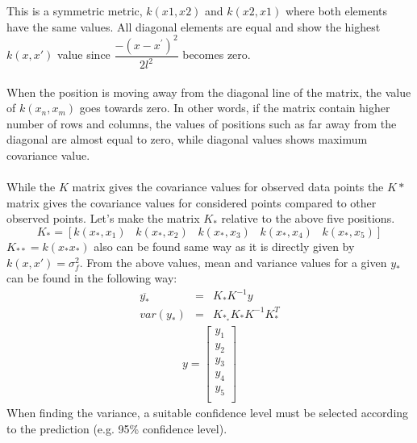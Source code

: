 This is a symmetric metric, $k(x1,x2)$ and $k(x2,x1)$  where both elements have the same values. All diagonal elements are equal and show the highest $k(x,x')$ value since $ \dfrac{-(x-x^{'})^{2}}{2l^{2}} $  becomes zero.
\\\\
When the position is moving away from the diagonal line of the matrix, the value of $k(x_{n},x_{m})$ goes towards zero. In other words, if the matrix contain higher number of rows and columns, the values of positions such as far away from the diagonal are almost equal to zero, while diagonal values shows maximum covariance value.
\\\\
While the $K$ matrix gives the covariance values for observed data points the $K*$ matrix gives the covariance values for considered points compared to other observed points. Let’s make the matrix $K_{*}$ relative to the above five positions.
\begin{equation}
K_{*} = [k(x_{*},x_{1}) \hspace{10pt} k(x_{*},x_{2}) \hspace{10pt} k(x_{*},x_{3}) \hspace{10pt} k(x_{*},x_{4}) \hspace{10pt} k(x_{*},x_{5})]
\label{eq:referanceName}
\end{equation}
$K_{**}= k(x_{*} x_{*})$ also can be found same way as it is directly given by $k(x,x')=\sigma_{f}^{2}$. From the above values, mean and variance values for a given $y_{*}$ can be found in the following way:
\begin{eqnarray}
 \overline{y_{*}} &=& K_{*}K^{-1} y    \nonumber \\
 var(y_{*})&=& K_{*}_{*}K_{*}K^{-1}K_{*}^{T}
\end{eqnarray}
\begin{eqnarray}
y = 
\begin{bmatrix} 
y_{1} \\ y_{2} \\ y_{3} \\ y_{4} \\ y_{5} \\ \end{bmatrix}
\label{eq:k-matrix}
\end{eqnarray}
When finding the variance, a suitable confidence level must be selected according to the prediction (e.g. 95\% confidence level).
